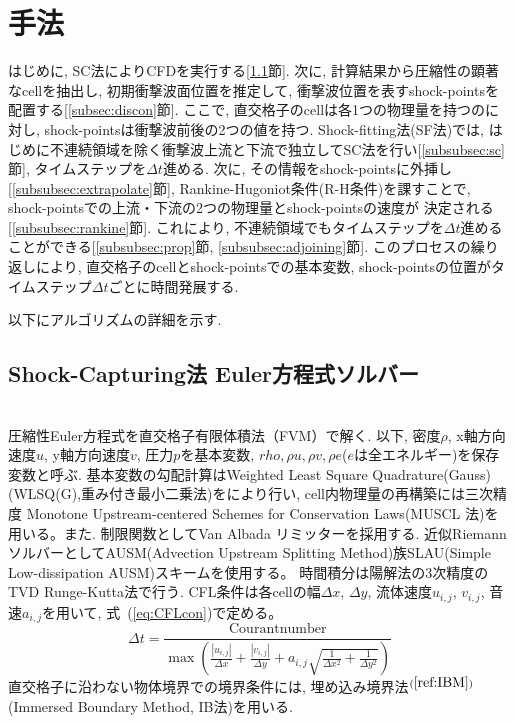 \documentclass[a4j]{jarticle}
\begin{document}
\section{手法} \label{sec:method}

はじめに, SC法によりCFDを実行する[\ref{subsec:sc}節]. 
次に, 計算結果から圧縮性の顕著なcellを抽出し, 初期衝撃波面位置を推定して, 
衝撃波位置を表すshock-pointsを配置する[\ref{subsec:discon}節].
ここで, 直交格子のcellは各1つの物理量を持つのに対し, shock-pointsは衝撃波前後の2つの値を持つ.
Shock-fitting法(SF法)では, はじめに不連続領域を除く衝撃波上流と下流で独立してSC法を行い[\ref{subsubsec:sc}節], タイムステップを$\Delta t$進める.
次に, その情報をshock-pointsに外挿し[\ref{subsubsec:extrapolate}節], Rankine-Hugoniot条件(R-H条件)を課すことで, shock-pointsでの上流・下流の2つの物理量とshock-pointsの速度が
決定される[\ref{subsubsec:rankine}節]. これにより, 不連続領域でもタイムステップを$\Delta t$進めることができる[\ref{subsubsec:prop}節, \ref{subsubsec:adjoining}節]. 
このプロセスの繰り返しにより, 直交格子のcellとshock-pointsでの基本変数, shock-pointsの位置がタイムステップ$\Delta t$ごとに時間発展する. 

以下にアルゴリズムの詳細を示す.

\subsection{Shock-Capturing法 Euler方程式ソルバー} \label{subsec:sc}
\mbox{}\\[-3.0ex]

圧縮性Euler方程式を直交格子有限体積法（FVM）で解く.
以下, 密度$\rho$, x軸方向速度$u$, y軸方向速度$v$, 圧力$p$を基本変数,
$rho, \rho u, \rho v, \rho e$($e$は全エネルギー)を保存変数と呼ぶ.
基本変数の勾配計算はWeighted Least Square Quadrature(Gauss)(WLSQ(G),重み付き最小二乗法)をにより行い, cell内物理量の再構築には三次精度 Monotone Upstream-centered
Schemes for Conservation Laws(MUSCL 法)を用いる。また. 制限関数としてVan Albada リミッターを採用する.
近似RiemannソルバーとしてAUSM(Advection Upstream Splitting Method)族SLAU(Simple Low-dissipation AUSM)スキームを使用する。
時間積分は陽解法の3次精度のTVD Runge-Kutta法で行う.
CFL条件は各cellの幅$\Delta x$, $\Delta y$, 流体速度$u_{i,j}$, $v_{i,j}$, 音速$a_{i, j}$を用いて, 式~(\ref{eq:CFLcon})で定める。
\begin{equation}
    \Delta t =
    \frac{\mathrm{Courant number}}{
        \max\left(
            \frac{|u_{i,j}|}{\Delta x}
            + \frac{|v_{i,j}|}{\Delta y}
            + a_{i,j}
              \sqrt{
                \frac{1}{\Delta x^2}
                + \frac{1}{\Delta y^2}
              }
        \right)
    }
    \label{eq:CFLcon}
\end{equation}
直交格子に沿わない物体境界での境界条件には, 埋め込み境界法$^{(\ref{ref:IBM})}$(Immersed Boundary Method, IB法)を用いる.
\end{document}
